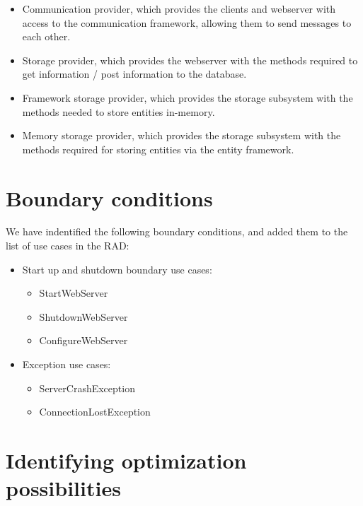 \begin{itemize}
	\item Communication provider, which provides the clients and webserver with access to the communication framework, allowing them to send messages to each other.
	\item Storage provider, which provides the webserver with the methods required to get information / post information to the database.
	\item Framework storage provider, which provides the storage subsystem with the methods needed to store entities in-memory.
	\item Memory storage provider, which provides the storage subsystem with the methods required for storing entities via the entity framework.
\end{itemize}

\section{Boundary conditions}

We have indentified the following boundary conditions, and added them to the list of use cases in the RAD:

\begin{itemize}
	\item Start up and shutdown boundary use cases:
	\begin{itemize}
			\item StartWebServer
			\item ShutdownWebServer
			\item ConfigureWebServer
	\end{itemize}
	\item Exception use cases:
	\begin{itemize}
			\item ServerCrashException
			\item ConnectionLostException
	\end{itemize}
\end{itemize}

\section{Identifying optimization possibilities}